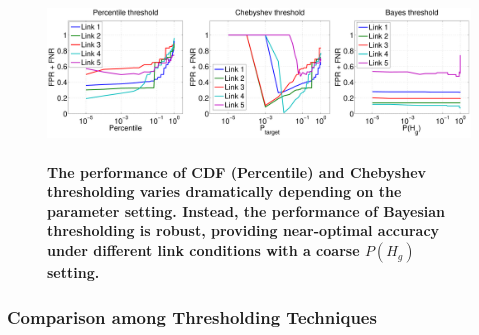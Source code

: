 \begin{figure}[t]
	\centering
	\includegraphics[width=1.0\linewidth, height = 4.5cm]{5-Compare_threshold_methods}
	\vspace{-0.7cm}
	\caption{\textbf{The performance of CDF (Percentile) and Chebyshev thresholding varies dramatically depending on the parameter setting. Instead, the performance of Bayesian thresholding is robust, providing near-optimal accuracy under different link conditions with a coarse $P(H_g)$ setting.}}
	\label{fig:EVA-ThdCompare}
	\vspace{-0.55cm}
\end{figure}


\subsubsection{Comparison among Thresholding Techniques}




